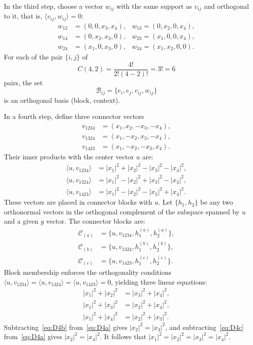 \documentclass[%
  reprint,
  superscriptaddress,
  showpacs,
  showkeys,
  amsmath,amssymb,
  pra,
  longbibliography,
  floatfix,
  x11names
]{revtex4-2}
\begin{document}
In the third step, choose a vector $w_{ij}$ with the same support as $v_{ij}$ and orthogonal to it, that is, $\langle v_{ij},w_{ij}\rangle=0$:
\begin{align*}
w_{12}&=(0,0,x_3,x_4), &
w_{13} =(0,x_2,0,x_4), \\
w_{14}&=(0,x_2,x_3,0), &
w_{23} =(x_1,0,0,x_4), \\
w_{24}&=(x_1,0,x_3,0), &
w_{34} =(x_1,x_2,0,0).
\end{align*}
For each of the pair $\{i,j\}$ of
$$C(4,2) = \frac{4!} {2!  (4-2)!}=3! = 6$$
pairs, the set
\[
\mathcal{B}_{ij}=\{e_i, e_j, v_{ij}, w_{ij}\}
\]
is an orthogonal basis (block, context).

In a fourth step, define three connector vectors
\begin{align*}
v_{1234}&=(x_1,x_2,-x_3,-x_4),\\
v_{1324}&=(x_1,-x_2,x_3,-x_4),\\
v_{1423}&=(x_1,-x_2,-x_3,x_4).
\end{align*}
Their inner products with the center vector $u$ are:
\begin{align*}
\langle u,v_{1234}\rangle &= |x_1|^2 + |x_2|^2 - |x_3|^2 - |x_4|^2,\\
\langle u,v_{1324}\rangle &= |x_1|^2 - |x_2|^2 + |x_3|^2 - |x_4|^2,\\
\langle u,v_{1423}\rangle &= |x_1|^2 - |x_2|^2 - |x_3|^2 + |x_4|^2.
\end{align*}
These vectors are placed in connector blocks with $u$. Let $\{h_1, h_2\}$ be any two orthonormal vectors in the orthogonal complement
of the subspace spanned by $u$ and a given $g$ vector. The connector blocks are:
\begin{align*}
\mathcal{C}_{(a)}&=\{u, v_{1234}, h^{(a)}_1, h^{(a)}_2\},\\
\mathcal{C}_{(b)}&=\{u, v_{1324}, h^{(b)}_1, h^{(b)}_2\},\\
\mathcal{C}_{(c)}&=\{u, v_{1423}, h^{(c)}_1, h^{(c)}_2\}.
\end{align*}
Block membership enforces the orthogonality conditions $\langle u,v_{1234}\rangle=\langle u,v_{1324}\rangle=\langle u,v_{1423}\rangle=0$, yielding three linear equations:
\begin{align}
|x_1|^2 + |x_2|^2 &= |x_3|^2 + |x_4|^2, \label{eq:D4a}\\
|x_1|^2 + |x_3|^2 &= |x_2|^2 + |x_4|^2, \label{eq:D4b}\\
|x_1|^2 + |x_4|^2 &= |x_2|^2 + |x_3|^2. \label{eq:D4c}
\end{align}
Subtracting~\eqref{eq:D4b} from~\eqref{eq:D4a} gives $|x_2|^2=|x_3|^2$, and subtracting~\eqref{eq:D4c} from~\eqref{eq:D4a} gives $|x_2|^2=|x_4|^2$. It follows that $|x_1|^2=|x_2|^2=|x_3|^2=|x_4|^2$.
\end{document}
